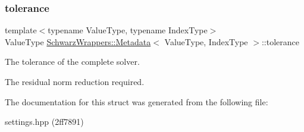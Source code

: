 \subsubsection{\texorpdfstring{tolerance}{tolerance}}
{\footnotesize\ttfamily template$<$typename Value\+Type, typename Index\+Type$>$ \\
Value\+Type \hyperlink{structSchwarzWrappers_1_1Metadata}{Schwarz\+Wrappers\+::\+Metadata}$<$ Value\+Type, Index\+Type $>$\+::tolerance}



The tolerance of the complete solver. 

The residual norm reduction required. 

The documentation for this struct was generated from the following file\+:\begin{DoxyCompactItemize}
\item 
settings.\+hpp (2ff7891)\end{DoxyCompactItemize}
